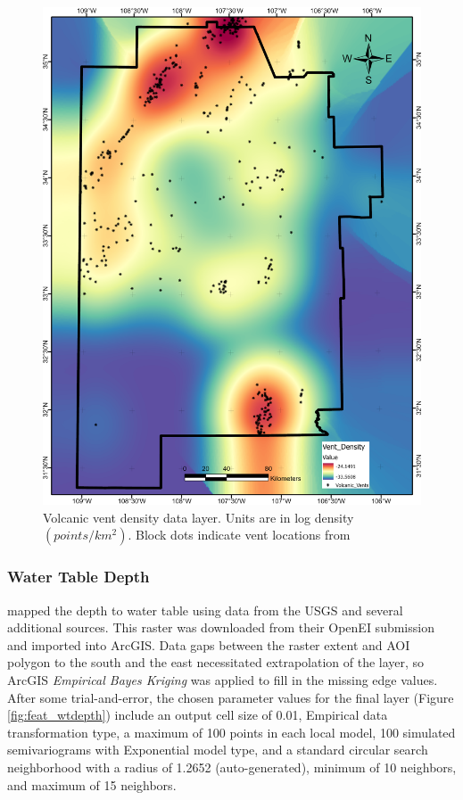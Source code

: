 \begin{figure}[!htp]
\centering
\includegraphics[scale=.50]{templates/images/Figure-VentDensity.png}
\caption[Volcanic vent data layer]{Volcanic vent density data layer. Units are in log density \((points/km^2)\). Block dots indicate vent locations from \protect\citep{nmbgmr_nmbgmr_2021}}
\label{fig:feat_vents}
\end{figure}

\subsubsection{Water Table Depth}

\citet{bielicki_hydrogeolgic_2015} mapped the depth to water table using data from the USGS and several additional sources. This raster was downloaded from their OpenEI submission \citep{kelley_geothermal_2015} and imported into ArcGIS. Data gaps between the raster extent and AOI polygon to the south and the east necessitated extrapolation of the layer, so ArcGIS \textit{Empirical Bayes Kriging} was applied to fill in the missing edge values. After some trial-and-error, the chosen parameter values for the final layer (Figure \ref{fig:feat_wtdepth}) include an output cell size of 0.01, Empirical data transformation type, a maximum of 100 points in each local model, 100 simulated semivariograms with Exponential model type, and a standard circular search neighborhood with a radius of 1.2652 (auto-generated), minimum of 10 neighbors, and maximum of 15 neighbors.

